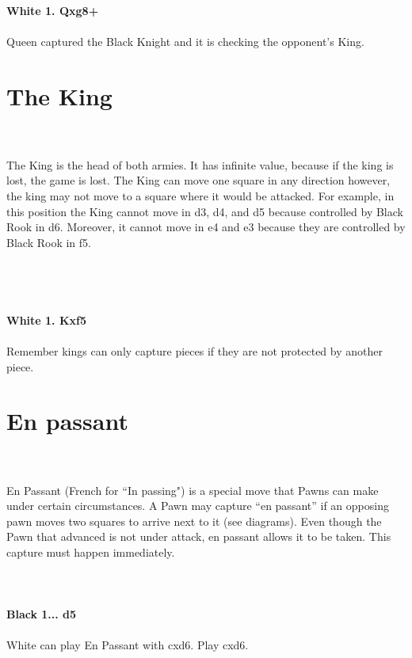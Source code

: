 \documentclass{article}
\begin{document}
\\

\\
\\
\textbf{White 1. Qxg8+}\\
\\
Queen captured the Black Knight and it is checking the opponent's King.\section{ The King}

\\
\\
The King is the head of both armies. It has infinite value, because if the king is lost, the game is lost. The King can move one square in any direction however, the king may not move to a square where it would be attacked. For example, in this position the King cannot move in d3, d4, and d5 because controlled by Black Rook in d6. Moreover, it cannot move in e4 and e3 because they are controlled by Black Rook in f5.\\\\
\\

\\
\\
\textbf{White 1. Kxf5}\\
\\
Remember kings can only capture pieces if they are not protected by another piece.\section{ En passant}

\\
\\
En Passant (French for “In passing") is a special move that Pawns can make under certain circumstances. A Pawn may capture “en passant” if an opposing pawn moves two squares to arrive next to it (see diagrams). Even though the Pawn that advanced is not under attack, en passant allows it to be taken. This capture must happen immediately.\\
\\

\\
\\
\textbf{Black 1... d5}\\
\\
White can play En Passant with cxd6. Play cxd6.\\
\end{document}
